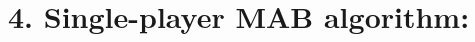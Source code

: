 \documentclass[12pt,english,ignorenonframetext,aspectratio=169,]{beamer}
\providecommand{\tightlist}{%
  \setlength{\itemsep}{0pt}\setlength{\parskip}{0pt}}
\begin{document}
\section{\hfill{}4. Single-player MAB algorithm: \klUCB\hfill{}}









\end{document}
